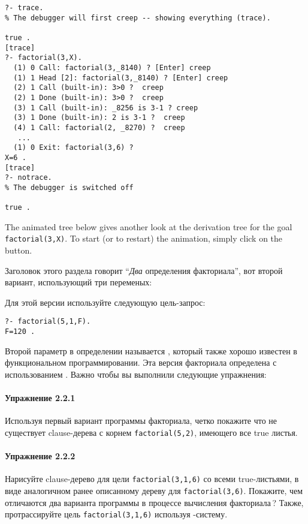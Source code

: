 \begin{verbatim}
?- trace. 
% The debugger will first creep -- showing everything (trace). 
 
true .
[trace] 
?- factorial(3,X). 
  (1) 0 Call: factorial(3,_8140) ? [Enter] creep 
  (1) 1 Head [2]: factorial(3,_8140) ? [Enter] creep 
  (2) 1 Call (built-in): 3>0 ?  creep
  (2) 1 Done (built-in): 3>0 ?  creep
  (3) 1 Call (built-in): _8256 is 3-1 ? creep 
  (3) 1 Done (built-in): 2 is 3-1 ?  creep
  (4) 1 Call: factorial(2, _8270) ?  creep
   ... 
  (1) 0 Exit: factorial(3,6) ? 
X=6 .
[trace] 
?- notrace. 
% The debugger is switched off 
 
true .
\end{verbatim}

The animated tree below gives another look at the derivation tree for the
\prolog goal \verb'factorial(3,X)'. To start (or to restart) the animation,
simply click on the  button.

\bigskip

Заголовок этого раздела говорит ``\emph{Два} определения факториала'', вот
второй вариант, использующий три переменых:


Для этой версии используйте следующую цель-запрос:

\begin{verbatim}
?- factorial(5,1,F). 
F=120 .
\end{verbatim}

Второй параметр в определении называется , который
также хорошо известен в функциональном программировании. Эта версия факториала
определена с использованием . Важно чтобы вы выполнили
следующие упражнения:

\paragraph{Упражнение 2.2.1} Используя первый вариант программы факториала,
четко покажите что не существует clause-дерева с корнем \verb'factorial(5,2)',
имеющего все true листья.

\paragraph{Упражнение 2.2.2} Нарисуйте clause-дерево для цели
\verb'factorial(3,1,6)' со всеми true-листьями, в виде аналогичном ранее
описанному дереву для \verb'factorial(3,6)'.
Покажите, чем отличаются два варианта программы в процессе вычисления
факториала\,? Также, протрассируйте цель \verb'factorial(3,1,6)' используя
\prolog-систему.
